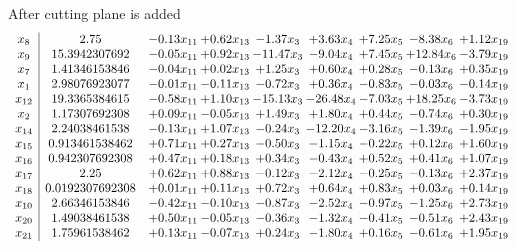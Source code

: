 \documentclass[8pt]{article}
\begin{document}
 After cutting plane is added 
\[\begin{array}{c| c c@{\hskip 2pt} c@{\hskip 2pt} c@{\hskip 2pt} c@{\hskip 2pt} c@{\hskip 2pt} c@{\hskip 2pt} c@{\hskip 2pt} }
 x_{8}   &  2.75 & -0.13 x_{11} & +  0.62 x_{13} & -1.37 x_{3} & +  3.63 x_{4} & +  7.25 x_{5} & -8.38 x_{6} & +  1.12 x_{19}\\
 x_{9}   &  15.3942307692 & -0.05 x_{11} & +  0.92 x_{13} & -11.47 x_{3} & -9.04 x_{4} & +  7.45 x_{5} & + 12.84 x_{6} & -3.79 x_{19}\\
 x_{7}   &  1.41346153846 & -0.04 x_{11} & +  0.02 x_{13} & +  1.25 x_{3} & +  0.60 x_{4} & +  0.28 x_{5} & -0.13 x_{6} & +  0.35 x_{19}\\
 x_{1}   &  2.98076923077 & -0.01 x_{11} & -0.11 x_{13} & -0.72 x_{3} & +  0.36 x_{4} & -0.83 x_{5} & -0.03 x_{6} & -0.14 x_{19}\\
 x_{12}   &  19.3365384615 & -0.58 x_{11} & +  1.10 x_{13} & -15.13 x_{3} & -26.48 x_{4} & -7.03 x_{5} & + 18.25 x_{6} & -3.73 x_{19}\\
 x_{2}   &  1.17307692308 & +  0.09 x_{11} & -0.05 x_{13} & +  1.49 x_{3} & +  1.80 x_{4} & +  0.44 x_{5} & -0.74 x_{6} & +  0.30 x_{19}\\
 x_{14}   &  2.24038461538 & -0.13 x_{11} & +  1.07 x_{13} & -0.24 x_{3} & -12.20 x_{4} & -3.16 x_{5} & -1.39 x_{6} & -1.95 x_{19}\\
 x_{15}   &  0.913461538462 & +  0.71 x_{11} & +  0.27 x_{13} & -0.50 x_{3} & -1.15 x_{4} & -0.22 x_{5} & +  0.12 x_{6} & +  1.60 x_{19}\\
 x_{16}   &  0.942307692308 & +  0.47 x_{11} & +  0.18 x_{13} & +  0.34 x_{3} & -0.43 x_{4} & +  0.52 x_{5} & +  0.41 x_{6} & +  1.07 x_{19}\\
 x_{17}   &  2.25 & +  0.62 x_{11} & +  0.88 x_{13} & -0.12 x_{3} & -2.12 x_{4} & -0.25 x_{5} & -0.13 x_{6} & +  2.37 x_{19}\\
 x_{18}   &  0.0192307692308 & +  0.01 x_{11} & +  0.11 x_{13} & +  0.72 x_{3} & +  0.64 x_{4} & +  0.83 x_{5} & +  0.03 x_{6} & +  0.14 x_{19}\\
 x_{10}   &  2.66346153846 & -0.42 x_{11} & -0.10 x_{13} & -0.87 x_{3} & -2.52 x_{4} & -0.97 x_{5} & -1.25 x_{6} & +  2.73 x_{19}\\
 x_{20}   &  1.49038461538 & +  0.50 x_{11} & -0.05 x_{13} & -0.36 x_{3} & -1.32 x_{4} & -0.41 x_{5} & -0.51 x_{6} & +  2.43 x_{19}\\
 x_{21}   &  1.75961538462 & +  0.13 x_{11} & -0.07 x_{13} & +  0.24 x_{3} & -1.80 x_{4} & +  0.16 x_{5} & -0.61 x_{6} & +  1.95 x_{19}\\

\end{array}\]
\end{document}

